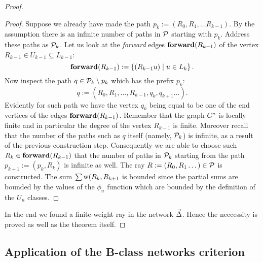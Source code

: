 \documentclass[12pt]{article}
\begin{document}
\begin{proof}
\begin{proof}
        Suppose we already have made the path $p_k:= (R_0, R_1,\dots R_{k-1})$. 
        By the assumption there is an infinite number of paths in $\cal{P}$ starting with $p_k$.
        Address these paths as $\cal{P}_k$.
        Let us look at the \emph{forward} edges $\efor(R_{k-1})$ of the vertex $R_{k-1} \in U_{k-1} \subseteq L_{k-1}$:
        \[
          \efor(R_{k-1}):=\left\{(R_{k-1} u) \mid u \in L_k\right\}.
        \]
        Now inspect the path $q \in \cal{P}_k \setminus p_k$ which has the prefix $p_k$:
        \[
          q:=(R_0,R_1,\dots,R_{k-1},q_k,q_{k+1} \dots).
        \]
        Evidently for such path we have the vertex $q_k$ being equal to be one of the end vertices of the edges $\efor(R_{k-1})$.
        Remember that the graph $\gstar$ is locally finite and in particular the degree of the vertex $R_{k-1}$ is finite.
        Moreover recall that the number of the paths such as $q$ itself (namely, $\cal{P}_k$) is infinite,
          as a result of the previous construction step.
        Consequently we are able to choose such $R_k \in \efor(R_{k-1})$ that the number of paths in $\cal{P}_k$ starting from
          the path $p_{k+1}:= (p_k, R_k)$ is infinite as well.
        The ray $R := (R_0, R_1 \dots) \in \cal{P}$ is constructed.
        The sum $\sum \wtp(R_k, R_{k+1}$ is bounded since the partial sums are bounded by the values of the $\phi_n$ function which are bounded
          by the definition of the $U_n$ classes.
      \end{proof}
      In the end we found a finite-weight ray in the network $\onet$.
      Hence the neccessity is proved as well as the theorem itself.
    \end{proof}
  \subsection{Application of the B-class networks criterion}
\end{document}
